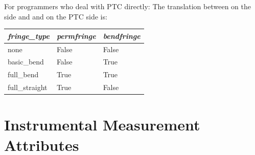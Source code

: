 For programmers who deal with PTC directly: The translation between
 on the \bmad side and  and  
on the PTC side is:
\begin{center}
\begin{tabular}{lll} \hline 
{\em fringe_type} & {\em permfringe} & {\em bendfringe} \\ \hline
  none            & False            & False            \\    
  basic_bend      & False            & True             \\    
  full_bend       & True             & True             \\    
  full_straight   & True             & False            \\    
\end{tabular}
\end{center}

\section{Instrumental Measurement Attributes}
\label{s:meas.attrib}


